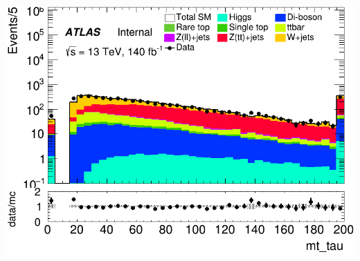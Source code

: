 \documentclass[usenames,dvipsnames]{beamer}
\begin{document}
\begin{frame}
\begin{minipage}{0.32\textwidth}
        \includegraphics[width=\textwidth]{graphics/H_met/H_met_mt_tau.png}
    \end{minipage}
    
    \vspace{0.5cm} %


\end{frame}
\end{document}
